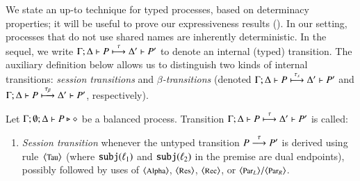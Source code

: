 {%
%
%
%


We   state  an up-to technique for typed processes, based on determinacy properties; it will be useful to prove our expressiveness results ().
In our setting, processes that do not use shared names are inherently deterministic. 
In the sequel, we write 
 $\Gamma; \Delta \vdash P \stackrel{\tau}{\longmapsto} \Delta' \vdash P'$ to denote an internal (typed) transition.
The auxiliary definition below allows us to distinguish two kinds of  internal transitions:
\emph{session transitions} and \emph{$\beta$-transitions} (denoted 
$\Gamma; \Delta \vdash P \stackrel{\tau_{s}}{\longmapsto} \Delta' \vdash P'$
and $\Gamma; \Delta \vdash P \stackrel{\tau_{\beta}}{\longmapsto} \Delta' \vdash P'$, respectively).

\begin{definition}
\label{def:dettrans}
	Let  $\Gamma; \emptyset; \Delta \vdash P \triangleright \diamond$ be a balanced \HOp process. 
	Transition $\Gamma; \Delta \vdash P \stackrel{\tau}{\longmapsto} \Delta' \vdash P'$ is called:
	\begin{enumerate}[$-$]
		\item	{\em Session transition}
				whenever the untyped transition $P \stackrel{\tau}{\longrightarrow} P'$ 
				is derived using  rule~${\footnotesize \langle \textrm{Tau} \rangle}$ 
				(where $\mathtt{subj}(\ell_1)$ and $\mathtt{subj}(\ell_2)$ in the premise are dual endpoints), 
				possibly followed by uses of
				${\footnotesize \langle \textrm{Alpha} \rangle}$, ${\footnotesize \langle \textrm{Res} \rangle}$, ${\footnotesize \langle \textrm{Rec} \rangle}$, or ${\footnotesize \langle \textrm{Par${}_L$} \rangle}/
				{\footnotesize \langle \textrm{Par${}_R$} \rangle}$.
		

\end{enumerate}
\end{definition}}
